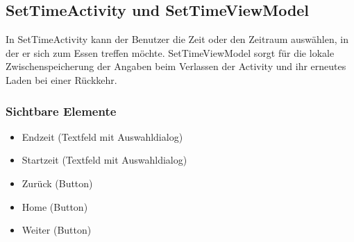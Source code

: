 \documentclass[a4paper]{scrreprt}
\begin{document}
\subsection{SetTimeActivity und SetTimeViewModel}
In SetTimeActivity kann der Benutzer die Zeit oder den Zeitraum auswählen, in der er sich zum Essen treffen möchte. SetTimeViewModel sorgt für die lokale Zwischenspeicherung der Angaben beim Verlassen der Activity und ihr erneutes Laden bei einer Rückkehr.

\subsubsection{Sichtbare Elemente}
\begin{itemize}
\item Endzeit (Textfeld mit Auswahldialog)
\item Startzeit (Textfeld mit Auswahldialog)
\item Zurück (Button) 
\item Home (Button) 
\item Weiter (Button) 
\end{itemize}
\end{document}
